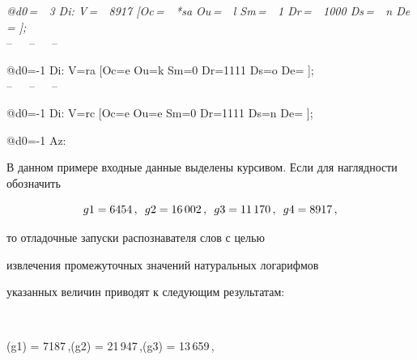 {\noindent


\textit{@d0\,=\ \ 3 Di: V\,=\ \ 8917 [Oc\,=\ \ *sa Ou\,=\ \ l Sm\,=\ \ 1 Dr\,=\ \ 1000 Ds\,=\ \ n De\,= ];}\\[-7pt]





            \hspace*{30mm}--\ \ \  --\ \ \ --\\[-7pt]


            





\noindent


{\sf @d0=-1 Di: V=ra [Oc=e Ou=k Sm=0 Dr=1111 Ds=o De= ];}\\[-7pt]





            \hspace*{30mm}--\ \ \  --\ \ \ --\\[-7pt]


            


\noindent


{\sf @d0=-1 Di: V=rc [Oc=e Ou=e Sm=0 Dr=1111 Ds=n De= ];}\\[-7pt]





\noindent


{\sf @d0=-1 Az:}\\


}








   В данном примере входные данные выделены курсивом. Если  для на\-гляд\-ности обозначить 


   $$


      g1 = 6454\,,\enskip g2 = 16\,002\,,\enskip g3 = 11\,170\,,\enskip g4 = 8917\,,


      $$


то отладочные запуски распознавателя слов с целью 


извлечения промежуточных  значений натуральных логарифмов 


указанных величин приводят к  следующим результатам: 


$$


      \ln(g1) = 7187\,,\enskip \ln(g2) = 21\,947\,,\enskip \ln(g3) = 13\,659\,,\enskip 



